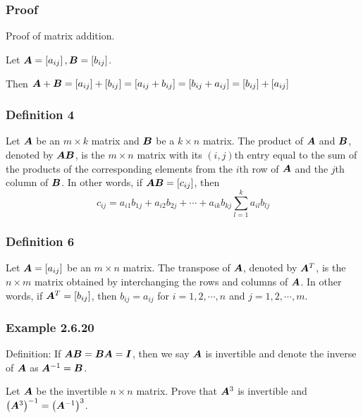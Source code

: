 \documentclass{article}
\begin{document}
\subsubsection{Proof}

Proof of matrix addition.

Let $ \matr{A} = \left[ a_{ij} \right], \matr{B} = \left[ b_{ij} \right] $.

Then $ \matr{A} + \matr{B} = \left[ a_{ij} \right] + \left[ b_{ij} \right] = \left[ a_{ij} + b_{ij} \right] = \left[ b_{ij} + a_{ij} \right] = \left[ b_{ij} \right] + \left[ a_{ij} \right] $

\subsubsection{Definition 4}

Let $ \matr{A} $ be an $ m \times k $ matrix and $ \matr{B} $ be a $ k \times n $ matrix. The product of $ \matr{A} $ and $ \matr{B} $, denoted by $ \matr{AB} $, is the $ m \times n $ matrix with its $ (i, j) $th entry equal to the sum of the products of the corresponding elements from the $ i $th row of $ \matr{A} $ and the $ j $th column of $ \matr{B} $. In other words, if $ \matr{AB} = [c_{ij}] $, then
\begin{equation*}
	c_{ij} = a_{i1}b_{1j} + a_{i2}b_{2j} + \cdots + a_{ik}b_{kj} \sum_{l = 1}^{k} a_{il}b_{lj}
\end{equation*}

\subsubsection{Definition 6}

Let $ \matr{A} = \left[ a_{ij} \right] $ be an $ m \times n $ matrix. The transpose of $ \matr{A} $, denoted by $ \matr{A}^{T} $, is the $ n \times m $ matrix obtained by interchanging the rows and columns of $ \matr{A} $. In other words, if $ \matr{A}^{T} = \left[ b_{ij} \right] $, then $ b_{ij} = a_{ij} $ for $ i = 1, 2, \cdots, n $ and $ j = 1, 2, \cdots, m $.

\subsubsection{Example 2.6.20}

Definition: If $ \matr{AB} = \matr{BA} = \matr{I} $, then we say $ \matr{A} $ is invertible and denote the inverse of $ \matr{A} $ as $ \matr{A}^{-1} = \matr{B} $.

Let $ \matr{A} $ be the invertible $ n \times n $ matrix. Prove that $ \matr{A}^3 $ is invertible and $ \left( \matr{A}^3 \right)^{-1} = \left( \matr{A}^{-1} \right)^3 $.
\end{document}
